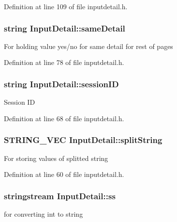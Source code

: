 \-Definition at line 109 of file inputdetail.\-h.

\hypertarget{classInputDetail_a13313d76b2ccc308634a7d802a46936a}{
\subsubsection[{same\-Detail}]{\setlength{\rightskip}{0pt plus 5cm}string {\bf \-Input\-Detail\-::same\-Detail}}}\label{classInputDetail_a13313d76b2ccc308634a7d802a46936a}
\-For holding value yes/no for same detail for rest of pages 

\-Definition at line 78 of file inputdetail.\-h.

\hypertarget{classInputDetail_a1f276e4df260009d465032ec64f3a543}{
\subsubsection[{session\-I\-D}]{\setlength{\rightskip}{0pt plus 5cm}string {\bf \-Input\-Detail\-::session\-I\-D}}}\label{classInputDetail_a1f276e4df260009d465032ec64f3a543}
\-Session \-I\-D 

\-Definition at line 68 of file inputdetail.\-h.

\hypertarget{classInputDetail_ab09ed4176090a72237531cedf00afb41}{
\subsubsection[{split\-String}]{\setlength{\rightskip}{0pt plus 5cm}\-S\-T\-R\-I\-N\-G\-\_\-\-V\-E\-C {\bf \-Input\-Detail\-::split\-String}}}\label{classInputDetail_ab09ed4176090a72237531cedf00afb41}
\-For storing values of splitted string 

\-Definition at line 60 of file inputdetail.\-h.

\hypertarget{classInputDetail_a5284736b5fd3db0251cfeab7c581c0bd}{
\subsubsection[{ss}]{\setlength{\rightskip}{0pt plus 5cm}stringstream {\bf \-Input\-Detail\-::ss}}}\label{classInputDetail_a5284736b5fd3db0251cfeab7c581c0bd}
for converting int to string 

